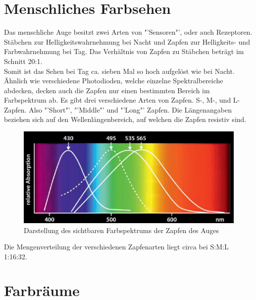 \documentclass[11pt]{scrartcl}
\begin{document}
\section{Menschliches Farbsehen}
Das menschliche Auge besitzt zwei Arten von "'Sensoren"', oder auch Rezeptoren. Stäbchen zur Helligkeitswahrnehmung bei Nacht und
Zapfen zur Helligkeits- und Farbwahrnehmung bei Tag. Das Verhältnis von Zapfen zu Stäbchen beträgt im Schnitt 20:1.\\
Somit ist das Sehen bei Tag ca. sieben Mal so hoch aufgelöst wie bei Nacht.\\
Ähnlich wie verschiedene Photodioden, welche einzelne Spektralbereiche abdecken, decken auch die Zapfen nur einen
bestimmten Bereich im Farbspektrum ab. Es gibt drei verschiedene Arten von Zapfen. S-, M-, und L-Zapfen. Also "'Short"',
"'Middle"' und "'Long"' Zapfen. Die Längenangaben beziehen sich auf den Wellenlängenbereich, auf welchen die Zapfen
resistiv sind.\\
\begin{figure}[H]
    \includegraphics[width=\textwidth]{images/eye_spectrum.png}
    \caption{Darstellung des sichtbaren Farbspektrums der Zapfen des Auges}\label{fig:eye_spectrum}
\end{figure}
\noindent
Die Mengenverteilung der verschiedenen Zapfenarten liegt circa bei S:M:L 1:16:32.
\clearpage

\section{Farbräume}
\end{document}
